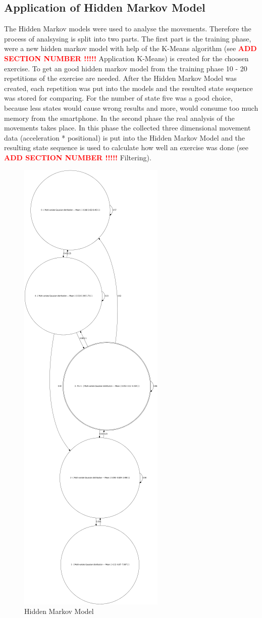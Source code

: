 \subsection{Application of Hidden Markov Model}

The Hidden Markov models were used to analyse the movements. Therefore the process of analsysing is split into two parts. The first part is the training phase, were a new hidden markov model with help of the K-Means algorithm (see  \textcolor{red}{\textbf{ ADD SECTION NUMBER !!!!!}} Application K-Means) is created for the choosen exercise. To get an good hidden markov model from the training phase 10 - 20 repetitions of the exercise are needed. After the Hidden Markov Model was created, each repetition was put into the models and the resulted state sequence was stored for comparing. For the number of state five was a good choice, because less states would cause wrong results and more, would consume too much memory from the smartphone. In the second phase the real analysis of the movements takes place. In this phase the collected three dimensional movement data (acceleration * positional) is put into the Hidden Markov Model and the resulting state sequence is used to calculate how well an exercise was done (see \textcolor{red}{\textbf{ ADD SECTION NUMBER !!!!!}} Filtering).
\begin{figure}[htp]
\centering
\includegraphics[scale=1.00]{00_resources/figures/output.png}
\caption{Hidden Markov Model}
\label{}
\end{figure}
